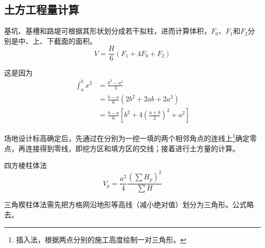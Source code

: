 \documentclass{book}
\begin{document}
\subsection{土方工程量计算}
\par 基坑、基槽和路堤可根据其形状划分成若干拟柱，进而计算体积，$F_0$、$F_1$和$F_2$分别是中、上、下截面的面积。
$$
    V = \frac{H}{6}(F_1+4F_0+F_2)
$$
\par 这是因为
\begin{align*}
    \int_a^b x^2 & = \frac{b^3-a^3}{3}                          \\
                 & = \frac{b-a}{6} (2b^2+2ab+2a^2)              \\
                 & = \frac{b-a}{6} [b^2+4(\frac{a+b}{2})^2+a^2]
\end{align*}
\par 场地设计标高确定后，先通过在分别为一挖一填的两个相邻角点的连线上\footnote{插入法，根据两点分别的施工高度绘制一对三角形。}确定零点，再连接得到零线，即挖方区和填方区的交线；接着进行土方量的计算。
\par 四方棱柱体法
$$
    V_p = \frac{a^2}{4} \frac{(\sum H_p)^2}{\sum H}
$$
\par 三角楔柱体法需先把方格网沿地形等高线（减小绝对值）划分为三角形。公式略去。
\end{document}
